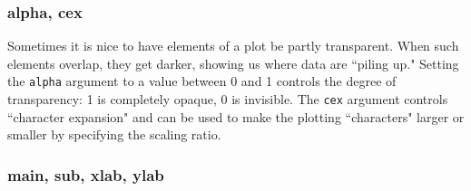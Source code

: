 \subsubsection{alpha, cex}
Sometimes it is nice to have elements of a plot be partly transparent.  When such
elements overlap, they get darker, showing us where data are ``piling up."
Setting the \verb!alpha! argument to a value between 0 and 1 controls the degree 
of transparency: 1 is completely opaque, 0 is invisible.
The \verb!cex! argument controls ``character expansion" and can be used to make the 
plotting ``characters" larger or smaller by specifying the scaling ratio.
\begin{knitrout}
\end{knitrout}


\vspace{-8mm}
\subsubsection*{main, sub, xlab, ylab}

